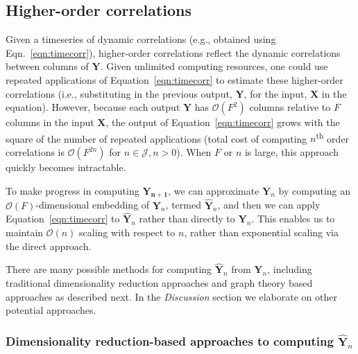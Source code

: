 \documentclass[english]{article}
\begin{document}
\subsection*{Higher-order correlations}
Given a timeseries of dynamic correlations (e.g., obtained using
Eqn.~\ref{eqn:timecorr}), higher-order correlations reflect the
dynamic correlations between columns of $\mathbf{Y}$.  Given unlimited
computing resources, one could use repeated applications of
Equation~\ref{eqn:timecorr} to estimate these higher-order
correlations (i.e., substituting in the previous output, $\mathbf{Y}$,
for the input, $\mathbf{X}$ in the equation).  However, because each
output $\mathbf{Y}$ has $\mathcal{O}(F^2)$ columns relative to $F$ columns in
the input $\mathbf{X}$, the output of Equation~\ref{eqn:timecorr}
grows with the square of the number of repeated applications (total
cost of computing $n$\textsuperscript{th} order correlations is
$\mathcal{O}(F^{2n})$ for $n \in \mathcal{J}, n > 0$).  When $F$ or $n$ is large,
this approach quickly becomes intractable.

To make progress in computing $\mathbf{Y_{n+1}}$, we can approximate
$\mathbf{Y}_n$ by computing an $\mathcal{O}(F)$-dimensional embedding of
$\mathbf{Y}_n$, termed $\hat{\mathbf{Y}}_n$, and then we can apply
Equation~\ref{eqn:timecorr} to $\hat{\mathbf{Y}}_n$ rather than
directly to $\mathbf{Y}_n$.  This enables us to maintain $\mathcal{O}(n)$
scaling with respect to $n$, rather than exponential scaling via the
direct approach.

There are many possible methods for computing $\hat{\mathbf{Y}}_n$
from $\mathbf{Y}_n$, including traditional dimensionality reduction
approaches and graph theory based approaches as described next.  In the
\textit{Discussion} section we elaborate on other potential approaches.

\subsubsection*{Dimensionality reduction-based approaches to computing
  $\hat{\mathbf{Y}}_n$}
\end{document}
